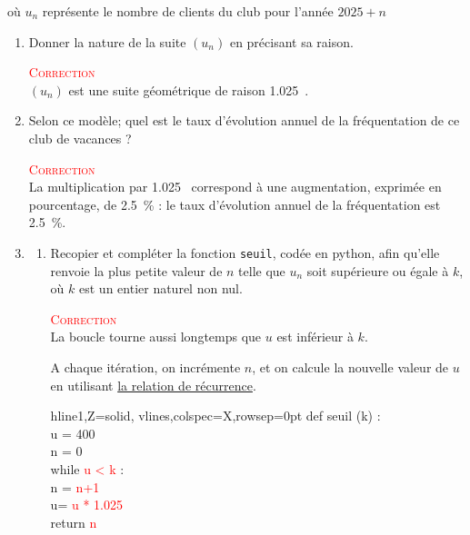 \documentclass[10pt]{article}
\providecommand{\np}[2][]{{#2~#1}}
\begin{document}
où $u_n$ représente le nombre de clients du club pour l'année \mbox{$2025+n$}
\begin{enumerate}
	\item Donner la nature de la suite $(u_n)$ en précisant sa raison.

					\textcolor{red}{\textsc{Correction}}\\
					$(u_n)$ est une suite géométrique de raison \np{1.025}.
	\item Selon ce modèle; quel est le taux d'évolution annuel de la fréquentation de ce club de vacances ?

					\textcolor{red}{\textsc{Correction}}\\
					La multiplication par \np{1.025} correspond à une augmentation, exprimée en pourcentage, de \np{2.5}\% : le taux d'évolution annuel de la fréquentation est \np{2.5}\%.
	\item
	 \begin{enumerate}
	\item
	\begin{minipage}[t]{0.66\linewidth}\vspace{0mm}
		Recopier et compléter la fonction \texttt{seuil}, codée en python, afin qu'elle renvoie la plus petite valeur de $n$ telle que $u_n$ soit supérieure ou égale à $k$, où $k$ est un entier naturel non nul.

				\textcolor{red}{\textsc{Correction}}\\
				La boucle \og{}tourne\fg{} aussi longtemps que $u$ est inférieur à $k$.

				A chaque itération, on incrémente $n$, et on calcule la nouvelle valeur de $u$ en utilisant \underline{la relation de récurrence}.
\end{minipage}
\hspace{0.05\linewidth}
	\begin{minipage}[t]{0.33\linewidth}\vspace{0cm}
	\begin{ttfamily}
\begin{tblr}{hline{1,Z}={solid}, vlines,colspec={X},rowsep=0pt}
	def seuil (k) :\\
	\qquad u = 400\\
	\qquad n = 0\\
	\qquad while  \textcolor{red}{u < k} :\\
	\qquad\qquad  n = \textcolor{red}{n+1}\\
	\qquad\qquad  u= \textcolor{red}{u * 1.025}\\
	\qquad return \textcolor{red}{n}\\
\end{tblr}
\end{ttfamily}
\end{minipage}



\end{enumerate}
\end{enumerate}
\end{document}
